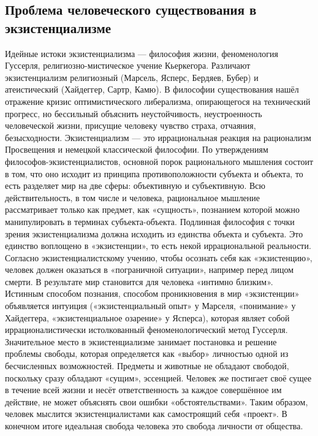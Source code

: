\documentclass[12pt]{article}
\begin{document}
\subsection{Проблема человеческого существования в экзистенциализме}
Идейные истоки экзистенциализма — философия жизни, феноменология Гуссерля, религиозно-мистическое
учение Кьеркегора. Различают экзистенциализм религиозный (Марсель, Ясперс, Бердяев, Бубер) и
атеистический (Хайдеггер, Сартр, Камю). В философии существования нашёл отражение кризис
оптимистического либерализма, опирающегося на технический прогресс, но бессильный объяснить
неустойчивость, неустроенность человеческой жизни, присущие человеку чувство страха, отчаяния,
безысходности.
Экзистенциализм — это иррациональная реакция на рационализм Просвещения и немецкой классической
философии. По утверждениям философов-экзистенциалистов, основной порок рационального мышления
состоит в том, что оно исходит из принципа противоположности субъекта и объекта, то есть разделяет мир на
две сферы: объективную и субъективную. Всю действительность, в том числе и человека, рациональное
мышление рассматривает только как предмет, как «сущность», познанием которой можно манипулировать в
терминах субъекта-объекта. Подлинная философия с точки зрения экзистенциализма должна исходить из
единства объекта и субъекта. Это единство воплощено в «экзистенции», то есть некой иррациональной
реальности.
Согласно экзистенциалистскому учению, чтобы осознать себя как «экзистенцию», человек должен оказаться в
«пограничной ситуации», например перед лицом смерти. В результате мир становится для человека «интимно
близким». Истинным способом познания, способом проникновения в мир «экзистенции» объявляется интуиция
(«экзистенциальный опыт» у Марселя, «понимание» у Хайдеггера, «экзистенциальное озарение» у Ясперса),
которая являет собой иррационалистически истолкованный феноменологический метод Гуссерля.
Значительное место в экзистенциализме занимает постановка и решение проблемы свободы, которая
определяется как «выбор» личностью одной из бесчисленных возможностей. Предметы и животные не
обладают свободой, поскольку сразу обладают «сущим», эссенцией. Человек же постигает своё сущее в течение
всей жизни и несёт ответственность за каждое совершённое им действие, не может объяснять свои ошибки
«обстоятельствами». Таким образом, человек мыслится экзистенциалистами как самостроящий себя «проект».
В конечном итоге идеальная свобода человека это свобода личности от общества.
\end{document}
